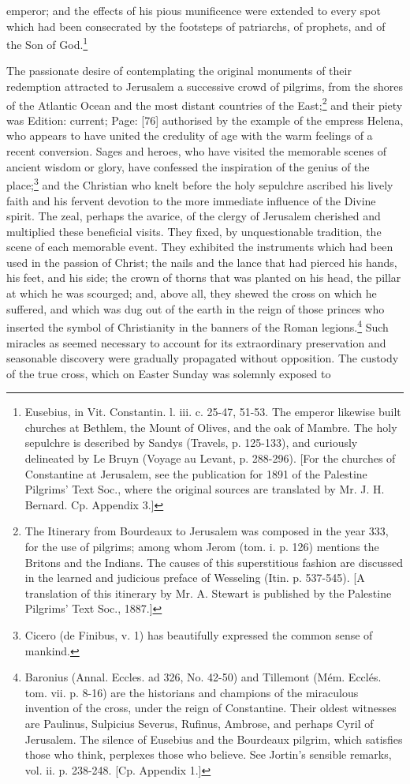 emperor; and the effects of his pious munificence were extended to every spot which had been consecrated by the footsteps of patriarchs, of prophets, and of the Son of God.\footnote{Eusebius, in Vit. Constantin. l. iii. c. 25-47, 51-53. The emperor likewise built churches at Bethlem, the Mount of Olives, and the oak of Mambre. The holy sepulchre is described by Sandys (Travels, p. 125-133), and curiously delineated by Le Bruyn (Voyage au Levant, p. 288-296). [For the churches of Constantine at Jerusalem, see the publication for 1891 of the Palestine Pilgrims\texthebrew{}’ Text Soc., where the original sources are translated by Mr. J. H. Bernard. Cp. Appendix 3.]}

The passionate desire of contemplating the original monuments of their redemption attracted to Jerusalem a successive crowd of pilgrims, from the shores of the Atlantic Ocean and the most distant countries of the East;\footnote{The Itinerary from Bourdeaux to Jerusalem was composed in the year 333, for the use of pilgrims; among whom Jerom (tom. i. p. 126) mentions the Britons and the Indians. The causes of this superstitious fashion are discussed in the learned and judicious preface of Wesseling (Itin. p. 537-545). [A translation of this itinerary by Mr. A. Stewart is published by the Palestine Pilgrims\texthebrew{}’ Text Soc., 1887.]} and their piety was Edition: current; Page: [76] authorised by the example of the empress Helena, who appears to have united the credulity of age with the warm feelings of a recent conversion. Sages and heroes, who have visited the memorable scenes of ancient wisdom or glory, have confessed the inspiration of the genius of the place;\footnote{Cicero (de Finibus, v. 1) has beautifully expressed the common sense of mankind.} and the Christian who knelt before the holy sepulchre ascribed his lively faith and his fervent devotion to the more immediate influence of the Divine spirit. The zeal, perhaps the avarice, of the clergy of Jerusalem cherished and multiplied these beneficial visits. They fixed, by unquestionable tradition, the scene of each memorable event. They exhibited the instruments which had been used in the passion of Christ; the nails and the lance that had pierced his hands, his feet, and his side; the crown of thorns that was planted on his head, the pillar at which he was scourged; and, above all, they shewed the cross on which he suffered, and which was dug out of the earth in the reign of those princes who inserted the symbol of Christianity in the banners of the Roman legions.\footnote{Baronius (Annal. Eccles. ad 326, No. 42-50) and Tillemont (Mém. Ecclés. tom. vii. p. 8-16) are the historians and champions of the miraculous invention of the cross, under the reign of Constantine. Their oldest witnesses are Paulinus, Sulpicius Severus, Rufinus, Ambrose, and perhaps Cyril of Jerusalem. The silence of Eusebius and the Bourdeaux pilgrim, which satisfies those who think, perplexes those who believe. See Jortin\texthebrew{}’s sensible remarks, vol. ii. p. 238-248. [Cp. Appendix 1.]} Such miracles as seemed necessary to account for its extraordinary preservation and seasonable discovery were gradually propagated without opposition. The custody of the true cross, which on Easter Sunday was solemnly exposed to 